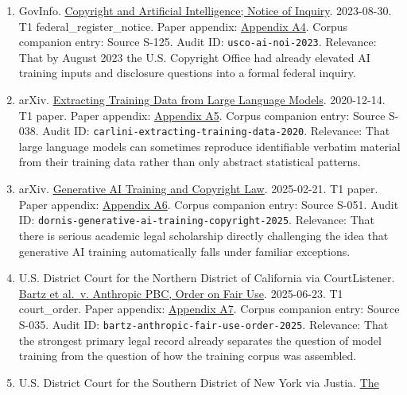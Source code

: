 \documentclass[
  american,
  11pt,
  letterpaper,
]{article}
\begin{document}
\begin{enumerate}
  accumulated user conversation data for frontier-AI training.
\item
  GovInfo.
  \href{https://www.govinfo.gov/content/pkg/FR-2023-08-30/pdf/2023-18624.pdf}{Copyright
  and Artificial Intelligence; Notice of Inquiry}. 2023-08-30. T1
  federal\_register\_notice. Paper appendix:
  \hyperref[appendix-a4-copyright-and-artificial-intelligence-notice-of-inquiry]{Appendix
  A4}. Corpus companion entry: Source S-125. Audit ID:
  \texttt{usco-ai-noi-2023}. Relevance: That by August 2023 the U.S.
  Copyright Office had already elevated AI training inputs and
  disclosure questions into a formal federal inquiry.
\item
  arXiv. \href{https://arxiv.org/abs/2012.07805}{Extracting Training
  Data from Large Language Models}. 2020-12-14. T1 paper. Paper
  appendix:
  \hyperref[appendix-a5-extracting-training-data-from-large-language-models]{Appendix
  A5}. Corpus companion entry: Source S-038. Audit ID:
  \texttt{carlini-extracting-training-data-2020}. Relevance: That large
  language models can sometimes reproduce identifiable verbatim material
  from their training data rather than only abstract statistical
  patterns.
\item
  arXiv. \href{https://arxiv.org/abs/2502.15858}{Generative AI Training
  and Copyright Law}. 2025-02-21. T1 paper. Paper appendix:
  \hyperref[appendix-a6-generative-ai-training-and-copyright-law]{Appendix
  A6}. Corpus companion entry: Source S-051. Audit ID:
  \texttt{dornis-generative-ai-training-copyright-2025}. Relevance: That
  there is serious academic legal scholarship directly challenging the
  idea that generative AI training automatically falls under familiar
  exceptions.
\item
  U.S. District Court for the Northern District of California via
  CourtListener.
  \href{https://storage.courtlistener.com/recap/gov.uscourts.cand.434709/gov.uscourts.cand.434709.231.0_3.pdf}{Bartz
  et al.~v. Anthropic PBC, Order on Fair Use}. 2025-06-23. T1
  court\_order. Paper appendix:
  \hyperref[appendix-a7-bartz-et-al-v-anthropic-pbc-order-on-fair-use]{Appendix
  A7}. Corpus companion entry: Source S-035. Audit ID:
  \texttt{bartz-anthropic-fair-use-order-2025}. Relevance: That the
  strongest primary legal record already separates the question of model
  training from the question of how the training corpus was assembled.
\item
  U.S. District Court for the Southern District of New York via Justia.
  \href{https://cases.justia.com/federal/district-courts/new-york/nysdce/1\%3A2023cv11195/612697/514/0.pdf?ts=1743868265}{The
}
\end{enumerate}
\end{document}

